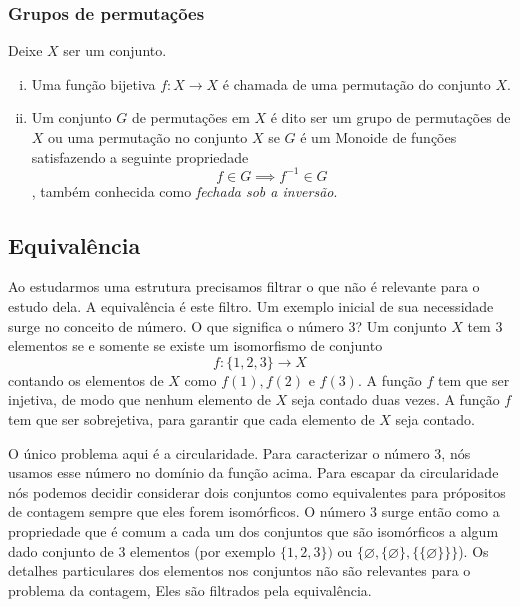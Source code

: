 \subsubsection{Grupos de permutações}
\begin{definition}
  Deixe $X$ ser um conjunto.
  \begin{enumerate}[i.]
    \item Uma função bijetiva $f: X \to X$ é chamada de uma permutação do conjunto $X$.
    \item Um conjunto $G$ de permutações em $X$ é dito ser um grupo de permutações de $X$ ou uma permutação no conjunto $X$ se $G$ é um Monoide de funções satisfazendo a seguinte propriedade $$f \in G \implies f^{-1} \in G$$, também conhecida como \emph{fechada sob a inversão}.
  \end{enumerate}
\end{definition}

\subsection{Equivalência}
Ao estudarmos uma estrutura precisamos filtrar o que não é relevante para o estudo dela. A equivalência é este filtro. Um exemplo inicial de sua necessidade surge no conceito de número. O que significa o número 3? Um conjunto $X$ tem 3 elementos se e somente se existe um isomorfismo de conjunto $$f: \{1,2,3\} \to X$$
contando os elementos de $X$ como $f(1), f(2)$ e $f(3)$. A função $f$ tem que ser injetiva, de modo que nenhum elemento de $X$ seja contado duas vezes. A função $f$ tem que ser sobrejetiva, para garantir que cada elemento de $X$ seja contado.

O único problema aqui é a circularidade. Para caracterizar o número 3, nós usamos esse número no domínio da função acima. Para escapar da circularidade nós podemos decidir considerar dois conjuntos como equivalentes para própositos de contagem sempre que eles forem isomórficos. O número 3 surge então como a propriedade que é comum a cada um dos conjuntos que são isomórficos a algum dado conjunto de 3 elementos (por exemplo $\{1,2,3\})$ ou $\{\varnothing , \{\varnothing\} , \{\{\varnothing\}\}\}$). Os detalhes particulares dos elementos nos conjuntos não são relevantes para o problema da contagem, Eles são filtrados pela equivalência.

